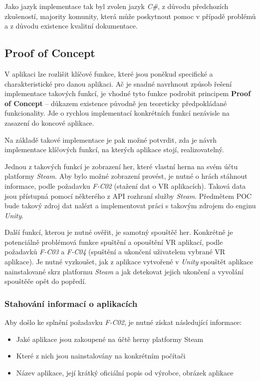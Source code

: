 Jako jazyk implementace tak byl zvolen jazyk \emph{C\#}, z důvodu
předchozích zkušeností, majority komunity, která může poskytnout pomoc v
případě problémů a z důvodu existence kvalitní dokumentace.

\subsection{Proof of Concept}\label{proof-of-concept}

V aplikaci lze rozlišit klíčové funkce, které jsou poněkud specifické a
charakteristické pro danou aplikaci. Ač je snadné navrhnout způsob
řešení implementace takových funkcí, je vhodné tyto funkce podrobit
principem \textbf{Proof of Concept} -- důkazem existence původně jen
teoreticky předpokládané funkcionality. Jde o rychlou implementací
konkrétních funkcí nezávisle na zasazení do koncové aplikace.

Na základě takové implementace je pak možné potvrdit, zda je návrh
implementace klíčových funkcí, na kterých aplikace stojí,
realizovatelný.

Jednou z takových funkcí je zobrazení her, které vlastní herna na svém
účtu platformy \emph{Steam}. Aby bylo možné zobrazení provést, je nutné
o hrách stáhnout informace, podle požadavku \emph{F-C02} (stažení dat o
VR aplikacích). Taková data jsou přístupná pomocí některého z API
rozhraní služby \emph{Steam}. Předmětem POC bude takový zdroj dat nalézt
a implementovat práci s takovým zdrojem do enginu \emph{Unity}.

Další funkcí, kterou je nutné ověřit, je samotný spouštěč her. Konkrétně
je potenciálně problémová funkce spuštění a opouštění VR aplikací, podle
požadavků \emph{F-C03} a \emph{F-C04} (spuštění a ukončení uživatelem
vybrané VR aplikace). Je nutné vyzkoušet, jak z aplikace vytvořené v
\emph{Unity} spouštět aplikace nainstalované skrz platformu \emph{Steam}
a jak detekovat jejich ukončení a vyvolání spouštěče opět do popředí.

\subsubsection{Stahování informací o
aplikacích}\label{stahovuxe1nuxed-informacuxed-o-aplikacuxedch}

Aby došlo ke splnění požadavku \emph{F-C02}, je nutné získat následující
informace:

\begin{itemize}
\tightlist
\item
  Jaké aplikace jsou zakoupené na účtě herny platformy Steam
\item
  Které z nich jsou nainstalovány na konkrétním počítači
\item
  Název aplikace, její krátký oficiální popis od výrobce, obrázek
  aplikace
\end{itemize}

